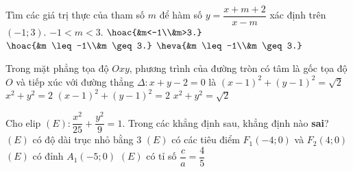 \begin{ex}%
	Tìm các giá trị thực của tham số $m$ để hàm số $y=\dfrac{x+m+2}{x-m}$ xác định trên $(-1;3)$.
	\def\dotEX{}
	\choice
	{$-1<m<3$.}
	{$\hoac{&m<-1\\&m>3.}$}
	{\True $\hoac{&m \leq -1\\&m \geq 3.}$}
	{$\heva{&m \leq -1\\&m \geq 3.}$}
\end{ex}

\begin{ex}%
	Trong mặt phẳng tọa độ $Oxy$, phương trình của đường tròn có tâm là gốc tọa độ $O$ và tiếp xúc với đường thẳng $\Delta\colon x+y-2=0$ là
	\choice
	{$(x-1)^2+(y-1)^2=\sqrt{2}$}
	{\True $x^2+y^2=2$}
	{$(x-1)^2+(y-1)^2=2$}
	{$x^2+y^2=\sqrt{2}$}
\end{ex}

\begin{ex}%
	Cho elip $(E)\colon\dfrac{x^2}{25}+\dfrac{y^2}{9}=1$. Trong các khẳng định sau, khẳng định nào \textbf{sai}?
	\choice
	{\True $(E)$ có độ dài trục nhỏ bằng $3$}
	{$(E)$ có các tiêu điểm $F_1(-4;0)$ và $F_2(4;0)$}
	{$(E)$ có đỉnh $A_1(-5;0)$}
	{$(E)$ có tỉ số $\dfrac{c}{a}=\dfrac{4}{5}$}
\end{ex}

